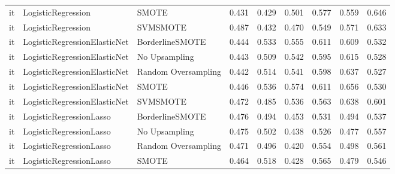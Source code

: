 \begin{tabular}{lllllllll}
      it &           LogisticRegression &               SMOTE & 0.431 &                     0.429 &                 0.501 &                  0.577 &                                   0.559 &     0.646 \\
      it &           LogisticRegression &            SVMSMOTE & 0.487 &                     0.432 &                 0.470 &                  0.549 &                                   0.571 &     0.633 \\
      it & LogisticRegressionElasticNet &     BorderlineSMOTE & 0.444 &                     0.533 &                 0.555 &                  0.611 &                                   0.609 &     0.532 \\
      it & LogisticRegressionElasticNet &       No Upsampling & 0.443 &                     0.509 &                 0.542 &                  0.595 &                                   0.615 &     0.528 \\
      it & LogisticRegressionElasticNet & Random Oversampling & 0.442 &                     0.514 &                 0.541 &                  0.598 &                                   0.637 &     0.527 \\
      it & LogisticRegressionElasticNet &               SMOTE & 0.446 &                     0.536 &                 0.574 &                  0.611 &                                   0.656 &     0.530 \\
      it & LogisticRegressionElasticNet &            SVMSMOTE & 0.472 &                     0.485 &                 0.536 &                  0.563 &                                   0.638 &     0.601 \\
      it &      LogisticRegressionLasso &     BorderlineSMOTE & 0.476 &                     0.494 &                 0.453 &                  0.531 &                                   0.494 &     0.537 \\
      it &      LogisticRegressionLasso &       No Upsampling & 0.475 &                     0.502 &                 0.438 &                  0.526 &                                   0.477 &     0.557 \\
      it &      LogisticRegressionLasso & Random Oversampling & 0.471 &                     0.496 &                 0.420 &                  0.554 &                                   0.498 &     0.561 \\
      it &      LogisticRegressionLasso &               SMOTE & 0.464 &                     0.518 &                 0.428 &                  0.565 &                                   0.479 &     0.546 \\

\end{tabular}
